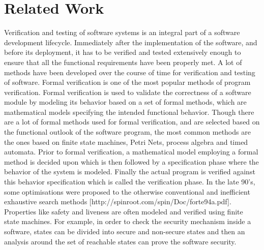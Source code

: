 

\section{Related Work}

Verification and testing of software systems is an integral part of a software development lifecycle. Immediately after the implementation of the software, and before its deployment, it has to be verified and tested extensively enough to ensure that all the functional requirements have been properly met. A lot of methods have been developed over the course of time for verification and testing of software. Formal verification is one of the most popular methods of program verification. Formal verification is used to validate the correctness of a software module by modeling its behavior based on a set of formal methods, which are mathematical models specifying the intended functional behavior. Though there are a lot of formal methods used for formal verification, and are selected based on the functional outlook of the software program, the most common methods are the ones based on finite state machines, Petri Nets, process algebra and timed automata. Prior to formal verification, a mathematical model employing a formal method is decided upon which is then followed by a specification phase where the behavior of the system is modeled. Finally the actual program is verified against this behavior specification which is called the verification phase. In the late 90's, some optimisations were proposed to the otherwise conventional and inefficient exhaustive search methods [http://spinroot.com/spin/Doc/forte94a.pdf]. Properties like safety and liveness are often modeled and verified using finite state machines. For example, in order to check the security mechanism inside a software, states can be divided into secure and non-secure states and then an analysis around the set of reachable states can prove the software security.

